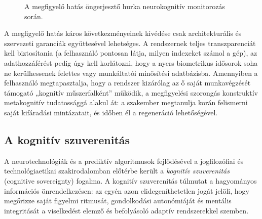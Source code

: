 \documentclass[12pt,a4paper,oneside]{book}
\begin{document}
\begin{figure}[H]
    \centering
    \caption{A megfigyelő hatás öngerjesztő hurka neurokognitív monitorozás során.}
    \label{fig:observer_effect}
\end{figure}

A megfigyelő hatás káros következményeinek kivédése csak architekturális és szervezeti garanciák együttesével lehetséges. A rendszernek teljes transzparenciát kell biztosítania (a felhasználó pontosan látja, milyen indexeket számol a gép), az adathozzáférést pedig úgy kell korlátozni, hogy a nyers biometrikus idősorok soha ne kerülhessenek felettes vagy munkáltatói minősítési adatbázisba. Amennyiben a felhasználó megtapasztalja, hogy a rendszer kizárólag az ő saját munkavégzését támogató „kognitív műszerfalként” működik, a megfigyelési szorongás konstruktív metakognitív tudatossággá alakul át: a szakember megtanulja korán felismerni saját kifáradási mintázatait, és időben él a regeneráció lehetőségével.

\subsection{A kognitív szuverenitás}

A neurotechnológiák és a prediktív algoritmusok fejlődésével a jogfilozófiai és technológiaetikai szakirodalomban előtérbe került a \emph{kognitív szuverenitás} (cognitive sovereignty) fogalma. A kognitív szuverenitás túlmutat a hagyományos információs önrendelkezésen: az egyén azon elidegeníthetetlen jogát jelöli, hogy megőrizze saját figyelmi ritmusát, gondolkodási autonómiáját és mentális integritását a viselkedést elemző és befolyásoló adaptív rendszerekkel szemben.
\end{document}
